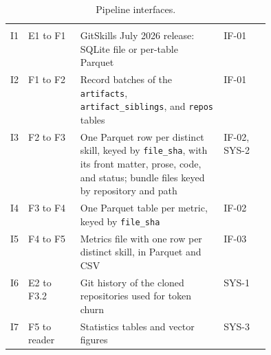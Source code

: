 \begin{singlespace}
\setlength{\LTcapwidth}{\linewidth}
\begin{longtable}{@{}L{0.06\linewidth} L{0.20\linewidth} L{\tabcolsep\relax} L{0.18\linewidth}@{}}
\caption{Pipeline interfaces.}\label{tab:interfaces}\\
 &  &  & \\
\midrule
\endfirsthead
{}
 &  &  & \\
\midrule
\endhead
\bottomrule
\endfoot
I1 & E1 to F1 & GitSkills July 2026 release: SQLite file or per-table Parquet & IF-01\\
I2 & F1 to F2 & Record batches of the \texttt{artifacts}, \texttt{artifact\_siblings}, and \texttt{repos} tables & IF-01\\
I3 & F2 to F3 & One Parquet row per distinct skill, keyed by \texttt{file\_sha}, with its front matter, prose, code, and status; bundle files keyed by repository and path & IF-02, SYS-2\\
I4 & F3 to F4 & One Parquet table per metric, keyed by \texttt{file\_sha} & IF-02\\
I5 & F4 to F5 & Metrics file with one row per distinct skill, in Parquet and CSV & IF-03\\
I6 & E2 to F3.2 & Git history of the cloned repositories used for token churn & SYS-1\\
I7 & F5 to reader & Statistics tables and vector figures & SYS-3\\
\end{longtable}
\end{singlespace}

